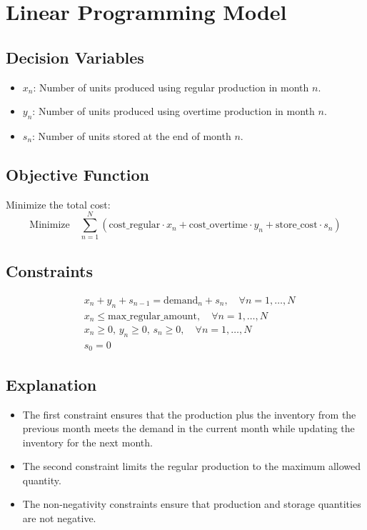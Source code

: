 \documentclass{article}
\begin{document}
\section*{Linear Programming Model}

\subsection*{Decision Variables}
\begin{itemize}
    \item \( x_n \): Number of units produced using regular production in month \( n \).
    \item \( y_n \): Number of units produced using overtime production in month \( n \).
    \item \( s_n \): Number of units stored at the end of month \( n \).
\end{itemize}

\subsection*{Objective Function}
Minimize the total cost:
\[
\text{Minimize} \quad \sum_{n=1}^{N} \left( \text{cost\_regular} \cdot x_n + \text{cost\_overtime} \cdot y_n + \text{store\_cost} \cdot s_n \right)
\]

\subsection*{Constraints}
\begin{align*}
    & x_n + y_n + s_{n-1} = \text{demand}_n + s_n, \quad \forall n = 1, \ldots, N \\
    & x_n \leq \text{max\_regular\_amount}, \quad \forall n = 1, \ldots, N \\
    & x_n \geq 0, \, y_n \geq 0, \, s_n \geq 0, \quad \forall n = 1, \ldots, N \\
    & s_0 = 0
\end{align*}

\subsection*{Explanation}
\begin{itemize}
    \item The first constraint ensures that the production plus the inventory from the previous month meets the demand in the current month while updating the inventory for the next month.
    \item The second constraint limits the regular production to the maximum allowed quantity.
    \item The non-negativity constraints ensure that production and storage quantities are not negative.
\end{itemize}
\end{document}
